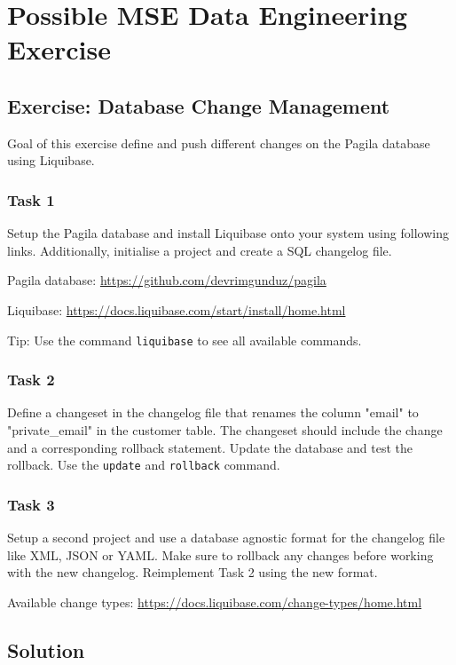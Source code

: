 
\chapter{Possible MSE Data Engineering Exercise}

\section{Exercise: Database Change Management}
Goal of this exercise define and push different changes on the Pagila database using Liquibase.

\subsection*{Task 1}
Setup the Pagila database and install Liquibase onto your system using following links. Additionally, initialise a project and create a SQL changelog file.

Pagila database: \url{https://github.com/devrimgunduz/pagila}

Liquibase: \url{https://docs.liquibase.com/start/install/home.html}

Tip: Use the command \texttt{liquibase} to see all available commands.

\subsection*{Task 2}
%
Define a changeset in the changelog file that renames the column "email" to "private\_email" in the customer table. The changeset should include the change and a corresponding rollback statement. Update the database and test the rollback. Use the \texttt{update} and \texttt{rollback} command.

\subsection*{Task 3}
%
Setup a second project and use a database agnostic format for the changelog file like XML, JSON or YAML. Make sure to rollback any changes before working with the new changelog. Reimplement Task 2 using the new format. 

Available change types: \url{https://docs.liquibase.com/change-types/home.html}


\section{Solution}

